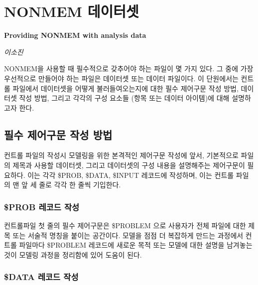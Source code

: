 \documentclass[
  10pt,
]{krantz}
\begin{document}
\hypertarget{nonmem-uxb370uxc774uxd130uxc14b}{%
\chapter{NONMEM 데이터셋}\label{nonmem-uxb370uxc774uxd130uxc14b}}

\textbf{Providing NONMEM with analysis data}

\emph{이소진}

NONMEM을 사용할 때 필수적으로 갖추어야 하는 파일이 몇 가지 있다. 그 중에 가장 우선적으로 만들어야 하는 파일은 데이터셋 또는 데이터 파일이다. 이 단원에서는 컨트롤 파일에서 데이터셋을 어떻게 불러들여오는지에 대한 필수 제어구문 작성 방법, 데이터셋 작성 방법, 그리고 각각의 구성 요소들 (항목 또는 데이터 아이템)에 대해 설명하고자 한다.

\hypertarget{uxd544uxc218-uxc81cuxc5b4uxad6cuxbb38-uxc791uxc131-uxbc29uxbc95}{%
\section{필수 제어구문 작성 방법}\label{uxd544uxc218-uxc81cuxc5b4uxad6cuxbb38-uxc791uxc131-uxbc29uxbc95}}

컨트롤 파일의 작성시 모델링을 위한 본격적인 제어구문 작성에 앞서, 기본적으로 파일의 제목과 사용할 데이터셋, 그리고 데이터셋의 구성 내용을 설명해주는 제어구문이 필요하다. 이는 각각 \$PROB, \$DATA, \$INPUT 레코드에 작성하며, 이는 컨트롤 파일의 맨 앞 세 줄로 각각 한 줄씩 기입한다.

\hypertarget{prob-uxb808uxcf54uxb4dc-uxc791uxc131}{%
\subsection{\$PROB 레코드 작성}\label{prob-uxb808uxcf54uxb4dc-uxc791uxc131}}

컨트롤파일 첫 줄의 필수 제어구문은 \$PROBLEM 으로 사용자가 전체 파일에 대한 제목 또는 서술적 명칭을 붙이는 공간이다. 모델을 점점 더 복잡하게 만드는 과정에서 컨트롤 파일마다 \$PROBLEM 레코드에 새로운 목적 또는 모델에 대한 설명을 남겨놓는 것이 모델링 과정을 정리함에 있어 도움이 된다.

\hypertarget{data-uxb808uxcf54uxb4dc-uxc791uxc131}{%
\subsection{\$DATA 레코드 작성}\label{data-uxb808uxcf54uxb4dc-uxc791uxc131}}
\end{document}
